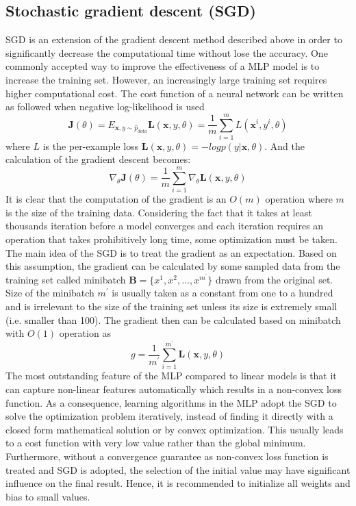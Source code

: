 \subsection{Stochastic gradient descent (SGD)}
\label{lr_sec:ml_sgd}
SGD is an extension of the gradient descent method described above in order to significantly decrease the computational time without lose the accuracy.
One commonly accepted way to improve the effectiveness of a MLP model is to increase the training set.
However, an increasingly large training set requires higher computational cost.
The cost function of a neural network can be written as followed when negative log-likelihood is used
\begin{equation}
    \mathbf{J}(\theta) = E_{\mathbf{x},y\sim\hat{p}_{data}}\mathbf{L}(\mathbf{x},y,\theta)
    =\frac{1}{m}\sum^m_{i=1}L(\mathbf{x}^{i},y^{i},\theta)
\end{equation}
%
where $L$ is the per-example loss $\mathbf{L}(\mathbf{x},y,\theta)=-log p(y|\mathbf{x},\theta)$.
And the calculation of the gradient descent becomes:
\begin{equation}
    \nabla_{\theta} \mathbf{J}(\theta)
    =\frac{1}{m}\sum^m_{i=1}\nabla_\theta \mathbf{L} (\mathbf{x},y,\theta)
\end{equation}
%
It is clear that the computation of the gradient is an $O(m)$ operation where $m$ is the size of the training data.
Considering the fact that it takes at least thousands iteration before a model converges and each iteration requires an operation that takes prohibitively long time, some optimization must be taken.
The main idea of the SGD is to treat the gradient as an expectation.
Based on this assumption, the gradient can be calculated by some sampled data from the training set called minibatch $\mathbf{B}=\{x^{1},x^{2},\dots,x^{m^\prime}\}$ drawn from the original set.
Size of the minibatch $m^\prime$ is usually taken as a constant from one to a hundred and is irrelevant to the size of the training set unless its size is extremely small (i.e. smaller than 100).
The gradient then can be calculated based on minibatch with $O(1)$ operation as
\begin{equation}
    g
    =\frac{1}{m^\prime} \sum^{m^\prime}_{i=1} \mathbf{L} (\mathbf{x},y,\theta)
\end{equation}
%
The most outstanding feature of the MLP compared to linear models is that it can capture non-linear features automatically which results in a non-convex loss function.
As a consequence, learning algorithms in the MLP adopt the SGD to solve the optimization problem iteratively, instead of finding it directly with a closed form mathematical solution or by convex optimization.
This usually leads to a cost function with very low value rather than the global minimum.
Furthermore, without a convergence guarantee as non-convex loss function is treated and SGD is adopted, the selection of the initial value may have significant influence on the final result.
Hence, it is recommended to initialize all weights and bias to small values.

